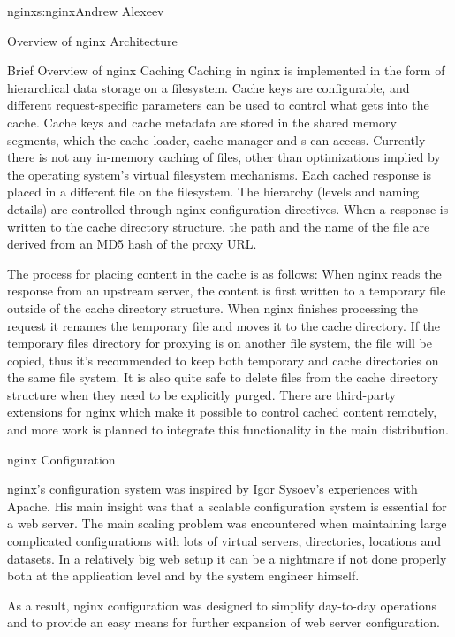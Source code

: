 \begin{aosachapter}{nginx}{s:nginx}{Andrew Alexeev}
\begin{aosasect1}{Overview of nginx Architecture}
\begin{aosasect2}{Brief Overview of nginx Caching}
Caching in nginx is implemented in the form of hierarchical data
storage on a filesystem. Cache keys are configurable, and different
request-specific parameters can be used to control what gets into the
cache. Cache keys and cache metadata are stored in the shared memory
segments, which the cache loader, cache manager and s
can access. Currently there is not any in-memory caching of files,
other than optimizations implied by the operating system's virtual
filesystem mechanisms. Each cached response is placed in a different
file on the filesystem. The hierarchy (levels and naming details) are
controlled through nginx configuration directives. When a response is
written to the cache directory structure, the path and the name of the
file are derived from an MD5 hash of the proxy URL.

The process for placing content in the cache is as follows:
When nginx reads the response from an upstream server, the
content is first written to a temporary file outside of the cache
directory structure. When nginx finishes processing the request it
renames the temporary file and moves it to the cache directory. If the
temporary files directory for proxying is on another file system, the
file will be copied, thus it's recommended to keep both temporary and
cache directories on the same file system. It is also quite safe to
delete files from the cache directory structure when they need to be
explicitly purged. There are third-party extensions for nginx
which make it possible to control cached content remotely,
and more work is planned to integrate this functionality in the main
distribution.

\end{aosasect2}

\end{aosasect1}

\begin{aosasect1}{nginx Configuration}

nginx's configuration system was inspired by Igor Sysoev's experiences with
Apache. His main insight was 
that a scalable configuration system
is essential for a web server. The main scaling problem was
encountered when maintaining large complicated configurations with
lots of virtual servers, directories, locations and datasets. In a
relatively big web setup it can be a nightmare if not done properly
both at the application level and by the system engineer himself.

As a result, nginx configuration was designed to simplify day-to-day
operations and to provide an easy means for further expansion of web
server configuration.


\end{aosasect1}
\end{aosachapter}
